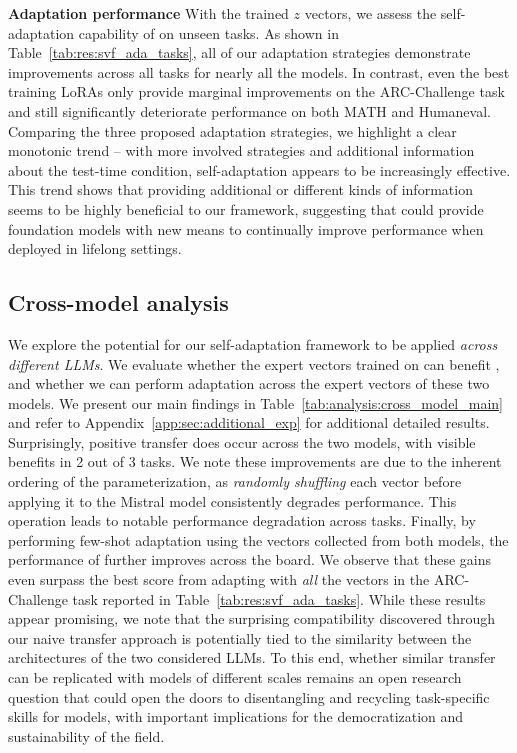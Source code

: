 \textbf{Adaptation performance}
With the \svdacro trained $z$ vectors, we assess the self-adaptation capability of \implname on unseen tasks.
As shown in Table~\ref{tab:res:svf_ada_tasks}, all of our \implname adaptation strategies demonstrate improvements across all tasks for nearly all the models.
In contrast, even the best training LoRAs only provide marginal improvements on the ARC-Challenge task and still significantly deteriorate performance on both MATH and Humaneval. 
Comparing the three proposed adaptation strategies, we highlight a clear monotonic trend -- with more involved strategies and additional information about the test-time condition, self-adaptation appears to be increasingly effective.
This trend shows that providing additional or different kinds of information seems to be highly beneficial to our framework, suggesting that \implname could provide foundation models with new means to continually improve performance when deployed in lifelong settings.



\vspace{-2mm}
\subsection{Cross-model analysis}
\vspace{-2mm}
\label{sec:analysis}
We explore the potential for our self-adaptation framework to be applied \textit{across different LLMs}. We evaluate whether the \svdacro expert vectors trained on \llama can benefit \mistral, and whether we can perform adaptation across the expert vectors of these two models. We present our main findings in Table~\ref{tab:analysis:cross_model_main} and refer to Appendix~\ref{app:sec:additional_exp} for additional detailed results. 
Surprisingly, positive transfer does occur across the two models, with visible benefits in 2 out of 3 tasks.
We note these improvements are due to the inherent ordering of the \svdacro parameterization, as \textit{randomly shuffling} each \svdacro vector before applying it to the Mistral model consistently degrades performance. 
This operation leads to notable performance degradation across tasks. 
Finally, by performing few-shot adaptation using the \svdacro vectors collected from both models, the performance of \mistral further improves across the board.
We observe that these gains even surpass the best score from adapting \mistral with \textit{all} the \svdacro vectors in the ARC-Challenge task reported in Table~\ref{tab:res:svf_ada_tasks}.  
While these results appear promising, we note that the surprising compatibility discovered through our naive transfer approach is potentially tied to the similarity between the architectures of the two considered LLMs.
To this end, whether similar transfer can be replicated with models of different scales remains an open research question that could open the doors to disentangling and recycling task-specific skills for models, with important implications for the democratization and sustainability of the field.

\vspace{-4mm}
